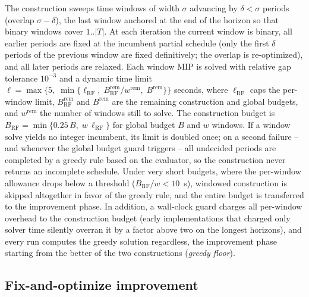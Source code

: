 The construction sweeps time windows of width $\sigma$ advancing by
$\delta<\sigma$ periods (overlap $\sigma-\delta$), the last window
anchored at the end of the horizon so that binary windows cover
$1..|T|$. At each iteration the current window is binary, all
earlier periods are fixed at the incumbent partial schedule (only
the first $\delta$ periods of the previous window are fixed
definitively; the overlap is re-optimized), and all later periods
are relaxed. Each window MIP is solved with relative gap tolerance
$10^{-3}$ and a dynamic time limit
$\ell = \max\{5,\;\min\{\ell_{\mathrm{RF}},\;
B_{\mathrm{RF}}^{\mathrm{rem}}/w^{\mathrm{rem}},\;
B^{\mathrm{rem}}\}\}$ seconds, where $\ell_{\mathrm{RF}}$ caps the
per-window limit, $B_{\mathrm{RF}}^{\mathrm{rem}}$ and
$B^{\mathrm{rem}}$ are the remaining construction and global budgets,
and $w^{\mathrm{rem}}$ the number of windows still to solve. The
construction budget is
$B_{\mathrm{RF}}=\min\{0.25\,B,\; w\,\ell_{\mathrm{RF}}\}$ for global
budget $B$ and $w$ windows. If a window solve yields no integer
incumbent, its limit is doubled once; on a second failure -- and
whenever the global budget guard triggers -- all undecided periods
are completed by a greedy rule based on the evaluator, so the
construction never returns an incomplete schedule. Under very short
budgets, where the per-window allowance drops below a threshold
($B_{\mathrm{RF}}/w<10$~s), windowed construction is skipped
altogether in favor of the greedy rule, and the entire budget is
transferred to the improvement phase. In addition, a wall-clock guard charges all per-window overhead to
the construction budget (early implementations that charged only
solver time silently overran it by a factor above two on the longest
horizons), and every run computes the greedy solution regardless, the
improvement phase starting from the better of the two constructions
(\emph{greedy floor}).

\subsection{Fix-and-optimize improvement}
\label{sec:fo}

